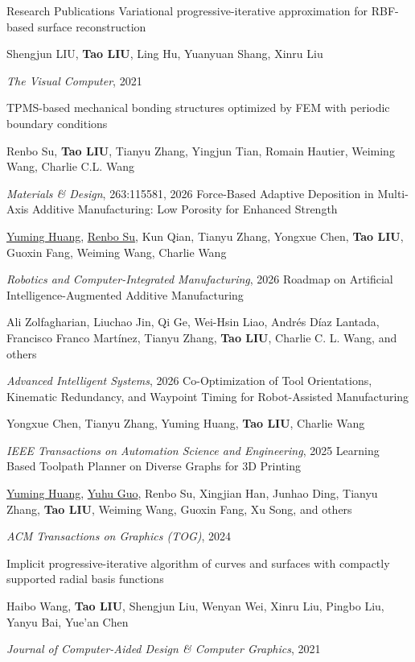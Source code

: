 \begin{rubric}{Research Publications}
\entry*[]
	[7] Variational progressive-iterative approximation for RBF-based surface reconstruction
	\par Shengjun LIU, \textbf{Tao LIU}, Ling Hu, Yuanyuan Shang, Xinru Liu
	\par \textit{The Visual Computer}, 2021


\entry*[]
	[6] TPMS-based mechanical bonding structures optimized by FEM with periodic boundary conditions
	\par Renbo Su, \textbf{Tao LIU}, Tianyu Zhang, Yingjun Tian, Romain Hautier, Weiming Wang, Charlie C.L. Wang
	\par \textit{Materials \& Design}, 263:115581, 2026
%
\entry*[]
	[5] Force-Based Adaptive Deposition in Multi-Axis Additive Manufacturing: Low Porosity for Enhanced Strength
	\par \underline{Yuming Huang}, \underline{Renbo Su}, Kun Qian, Tianyu Zhang, Yongxue Chen, \textbf{Tao LIU}, Guoxin Fang, Weiming Wang, Charlie Wang
	\par \textit{Robotics and Computer-Integrated Manufacturing}, 2026
%
\entry*[]
	[4] Roadmap on Artificial Intelligence-Augmented Additive Manufacturing
	\par Ali Zolfagharian, Liuchao Jin, Qi Ge, Wei-Hsin Liao, Andrés Díaz Lantada, Francisco Franco Martínez, Tianyu Zhang, \textbf{Tao LIU}, Charlie C. L. Wang, and others
	\par \textit{Advanced Intelligent Systems}, 2026
%
\entry*[]
	[3] Co-Optimization of Tool Orientations, Kinematic Redundancy, and Waypoint Timing for Robot-Assisted Manufacturing
	\par Yongxue Chen, Tianyu Zhang, Yuming Huang, \textbf{Tao LIU}, Charlie Wang
	\par \textit{IEEE Transactions on Automation Science and Engineering}, 2025
%
\entry*[]
	[2] Learning Based Toolpath Planner on Diverse Graphs for 3D Printing
	\par \underline{Yuming Huang}, \underline{Yuhu Guo}, Renbo Su, Xingjian Han, Junhao Ding, Tianyu Zhang, \textbf{Tao LIU}, Weiming Wang, Guoxin Fang, Xu Song, and others
	\par \textit{ACM Transactions on Graphics (TOG)}, 2024


%
\entry*[]
	[1] Implicit progressive-iterative algorithm of curves and surfaces with compactly supported radial basis functions
	\par Haibo Wang, \textbf{Tao LIU}, Shengjun Liu, Wenyan Wei, Xinru Liu, Pingbo Liu, Yanyu Bai, Yue'an Chen
	\par \textit{Journal of Computer-Aided Design \& Computer Graphics}, 2021
%
\end{rubric}
